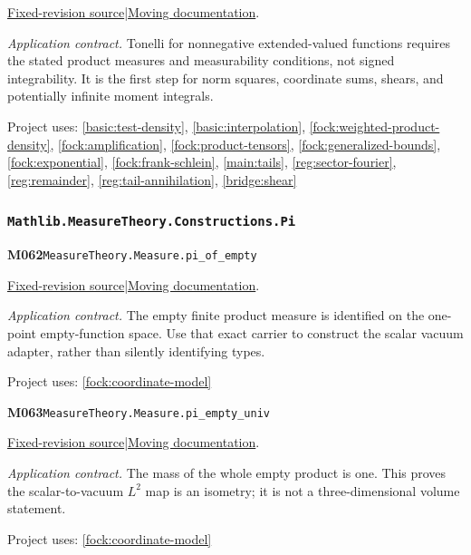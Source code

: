 \documentclass[11pt,a4paper]{article}
\theoremstyle{definition}
\theoremstyle{remark}
\begin{document}
\href{https://github.com/leanprover-community/mathlib4/blob/9bac2d0692944a775113f7c130fd5e5b4608a854/Mathlib/MeasureTheory/Measure/Prod.lean}{Fixed-revision source}\quad|\quad\href{https://leanprover-community.github.io/mathlib4_docs/Mathlib/MeasureTheory/Measure/Prod.html#MeasureTheory.lintegral_prod}{Moving documentation}.\par
\noindent\textit{Application contract.} Tonelli for nonnegative extended-valued functions requires the stated product measures and measurability conditions, not signed integrability. It is the first step for norm squares, coordinate sums, shears, and potentially infinite moment integrals.\par
{\small Project uses: \ref{basic:test-density}, \ref{basic:interpolation}, \ref{fock:weighted-product-density}, \ref{fock:amplification}, \ref{fock:product-tensors}, \ref{fock:generalized-bounds}, \ref{fock:exponential}, \ref{fock:frank-schlein}, \ref{main:tails}, \ref{reg:sector-fourier}, \ref{reg:remainder}, \ref{reg:tail-annihilation}, \ref{bridge:shear}}\par\medskip

\subsubsection*{\nolinkurl{Mathlib.MeasureTheory.Constructions.Pi}}
\noindent\textbf{M062}\label{base:M062}\quad\nolinkurl{MeasureTheory.Measure.pi_of_empty}

\href{https://github.com/leanprover-community/mathlib4/blob/9bac2d0692944a775113f7c130fd5e5b4608a854/Mathlib/MeasureTheory/Constructions/Pi.lean}{Fixed-revision source}\quad|\quad\href{https://leanprover-community.github.io/mathlib4_docs/Mathlib/MeasureTheory/Constructions/Pi.html#MeasureTheory.Measure.pi_of_empty}{Moving documentation}.\par
\noindent\textit{Application contract.} The empty finite product measure is identified on the one-point empty-function space. Use that exact carrier to construct the scalar vacuum adapter, rather than silently identifying types.\par
{\small Project uses: \ref{fock:coordinate-model}}\par\medskip

\noindent\textbf{M063}\label{base:M063}\quad\nolinkurl{MeasureTheory.Measure.pi_empty_univ}

\href{https://github.com/leanprover-community/mathlib4/blob/9bac2d0692944a775113f7c130fd5e5b4608a854/Mathlib/MeasureTheory/Constructions/Pi.lean}{Fixed-revision source}\quad|\quad\href{https://leanprover-community.github.io/mathlib4_docs/Mathlib/MeasureTheory/Constructions/Pi.html#MeasureTheory.Measure.pi_empty_univ}{Moving documentation}.\par
\noindent\textit{Application contract.} The mass of the whole empty product is one. This proves the scalar-to-vacuum $L^2$ map is an isometry; it is not a three-dimensional volume statement.\par
{\small Project uses: \ref{fock:coordinate-model}}\par\medskip
\end{document}
